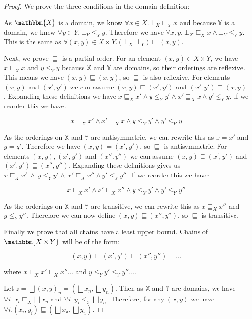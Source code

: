 \begin{proof}
We prove the three conditions in the domain definition:

As $\mathbbm{X}$ is a domain, we know $\forall x \in X. \ \bot_X \sqsubseteq_X x$ and because $\mathbb{Y}$ is a domain, we know $\forall y \in Y. \ \bot_Y \leq_Y y$. Therefore we have $\forall x,y . \ \bot_X \sqsubseteq_X x \wedge \bot_Y \leq_Y y$. This is the same as $\forall (x,y) \in X \times Y. (\bot_X,\bot_Y) \sqsubseteq (x,y)$.

Next, we prove $\sqsubseteq $ is a partial order. For an element $(x,y) \in X \times Y$, we have $x \sqsubseteq_X x$ and $y \leq_Y y$ because $\mathbb{X}$ and $\mathbb{Y}$ are domains, so their orderings are reflexive. This means we have $(x,y) \sqsubseteq (x,y)$, so $\sqsubseteq$ is also reflexive. For elements $(x,y)$ and $(x',y')$ we can assume $(x,y) \sqsubseteq (x',y')$ and $(x',y') \sqsubseteq (x,y)$. Expanding these definitions we have $x \sqsubseteq_X x' \wedge y \leq_Y y' \wedge x' \sqsubseteq_X x \wedge y' \leq_Y y$. If we reorder this we have:

\[x \sqsubseteq_X x' \wedge x' \sqsubseteq_X x \wedge y \leq_Y y' \wedge y' \leq_Y y \]

As the orderings on $\mathbb{X}$ and $\mathbb{Y}$ are antisymmetric, we can rewrite this as $x = x'$ and $y = y'$. Therefore we have $(x,y) = (x',y')$, so $\sqsubseteq$ is antisymmetric. For elements $(x,y), (x',y')$ and $(x'',y'')$ we can assume $(x,y) \sqsubseteq (x',y')$ and $(x',y') \sqsubseteq (x'',y'')$. Expanding these definitions gives us $x \sqsubseteq_X x' \ \wedge \ y \leq_Y y' \wedge \ x' \sqsubseteq_X x'' \wedge y' \leq_Y y''$. If we reorder this we have:


\[x \sqsubseteq_X x' \wedge x' \sqsubseteq_X x'' \wedge y \leq_Y y' \wedge y' \leq_Y y'' \]

As the orderings on $\mathbb{X}$ and $\mathbb{Y}$ are transitive, we can rewrite this as $x \sqsubseteq_X x''$ and $y \leq_Y y''$. Therefore we can now define $(x,y) \sqsubseteq (x'',y'')$, so $\sqsubseteq$ is transitive.

Finally we prove that all chains have a least upper bound. Chains of $\mathbbm{X \times Y}$ will be of the form:

\[(x,y) \sqsubseteq (x', y') \sqsubseteq (x'', y'') \sqsubseteq \dots \]

where $x \sqsubseteq_X x' \sqsubseteq_X x'' \dots$ and $y \leq_Y y' \leq_Y y'' \dots $.

Let $z = \bigsqcup (x, y)_n = (\bigsqcup x_n, \bigsqcup y_n)$. Then as $\mathbb{X}$ and $\mathbb{Y}$ are domains, we have $\forall i. \ x_i \sqsubseteq_X \bigsqcup x_n$ and  $\forall i. \  y_i \leq_Y \bigsqcup y_n$. Therefore, for any $(x,y)$ we have $\forall i. (x_i ,y_i) \sqsubseteq (\bigsqcup x_n , \bigsqcup y_n)$.


\end{proof}
